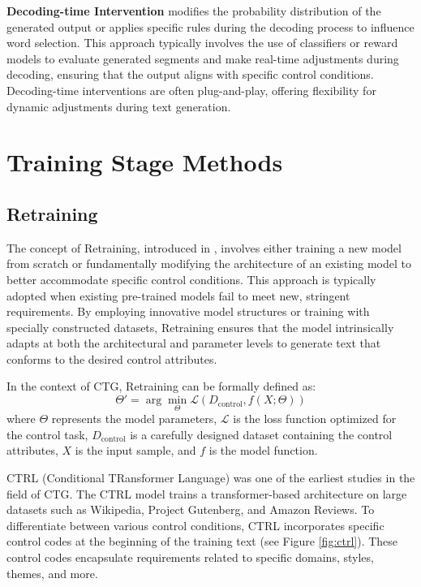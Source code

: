 \documentclass[acmsmall, screen]{acmart}
\begin{document}
\textbf{Decoding-time Intervention}\cite{dathathri_iclr20_PPLM,krause_emnlp21_gedi,yang_acl21_fudge} modifies the probability distribution of the generated output or applies specific rules during the decoding process to influence word selection. This approach typically involves the use of classifiers or reward models to evaluate generated segments and make real-time adjustments during decoding, ensuring that the output aligns with specific control conditions. Decoding-time interventions are often plug-and-play, offering flexibility for dynamic adjustments during text generation.



\section{Training Stage Methods}
\label{sec:train_methods}

\subsection{Retraining}

The concept of Retraining, introduced in \cite{zhang_ACMCS23_CTGSurvey}, involves either training a new model from scratch or fundamentally modifying the architecture of an existing model to better accommodate specific control conditions. This approach is typically adopted when existing pre-trained models fail to meet new, stringent requirements. By employing innovative model structures or training with specially constructed datasets, Retraining ensures that the model intrinsically adapts at both the architectural and parameter levels to generate text that conforms to the desired control attributes.

In the context of CTG, Retraining can be formally defined as:
\begin{equation}
\Theta' = \arg\min_{\Theta} \mathcal{L}(D_{\text{control}}, f(X; \Theta))
\end{equation}
where \( \Theta \) represents the model parameters, \( \mathcal{L} \) is the loss function optimized for the control task, \( D_{\text{control}} \) is a carefully designed dataset containing the control attributes, \( X \) is the input sample, and \( f \) is the model function.

CTRL (Conditional TRansformer Language)\cite{keskar_arxiv19_Ctrl} was one of the earliest studies in the field of CTG. The CTRL model trains a transformer-based architecture on large datasets such as Wikipedia, Project Gutenberg, and Amazon Reviews. To differentiate between various control conditions, CTRL incorporates specific control codes at the beginning of the training text (see Figure \ref{fig:ctrl}). These control codes encapsulate requirements related to specific domains, styles, themes, and more.
\end{document}
